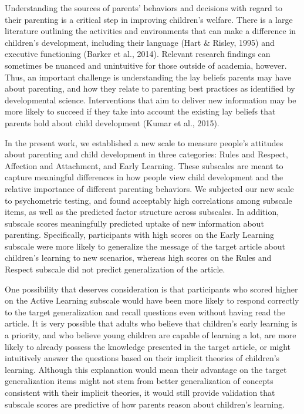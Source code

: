 \documentclass[10pt, letterpaper]{article}
\begin{document}
Understanding the sources of parents' behaviors and decisions with
regard to their parenting is a critical step in improving children's
welfare. There is a large literature outlining the activities and
environments that can make a difference in children's development,
including their language (Hart \& Risley, 1995) and executive
functioning (Barker et al., 2014). Relevant research findings can
sometimes be nuanced and unintuitive for those outside of academia,
however. Thus, an important challenge is understanding the lay beliefs
parents may have about parenting, and how they relate to parenting best
practices as identified by developmental science. Interventions that aim
to deliver new information may be more likely to succeed if they take
into account the existing lay beliefs that parents hold about child
development (Kumar et al., 2015).

In the present work, we established a new scale to measure people's
attitudes about parenting and child development in three categories:
Rules and Respect, Affection and Attachment, and Early Learning. These
subscales are meant to capture meaningful differences in how people view
child development and the relative importance of different parenting
behaviors. We subjected our new scale to psychometric testing, and found
acceptably high correlations among subscale items, as well as the
predicted factor structure across subscales. In addition, subscale
scores meaningfully predicted uptake of new information about parenting.
Specifically, participants with high scores on the Early Learning
subscale were more likely to generalize the message of the target
article about children's learning to new scenarios, whereas high scores
on the Rules and Respect subscale did not predict generalization of the
article.

One possibility that deserves consideration is that participants who
scored higher on the Active Learning subscale would have been more
likely to respond correctly to the target generalization and recall
questions even without having read the article. It is very possible that
adults who believe that children's early learning is a priority, and who
believe young children are capable of learning a lot, are more likely to
already possess the knowledge presented in the target article, or might
intuitively answer the questions based on their implicit theories of
children's learning. Although this explanation would mean their
advantage on the target generalization items might not stem from better
generalization of concepts consistent with their implicit theories, it
would still provide validation that subscale scores are predictive of
how parents reason about children's learning.
\end{document}
